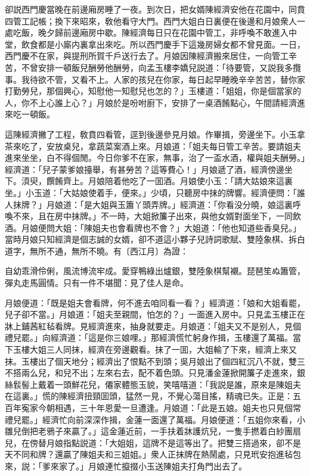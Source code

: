 卻説西門慶當晚在前邊廂房睡了一夜。到次日，把女婿陳經濟安他在花園中，同賁四管工記帳；換下來昭來，敎他看守大門。西門大姐白日裏便在後邊和月娘衆人一處吃飯，晚夕歸前邊廂房中歇。陳經濟每日只在花園中管工，非呼喚不敢進入中堂，飲食都是小廝内裏拿出來吃。所以西門慶手下這幾房婦女都不曾見面。一日，西門慶不在家，與提刑所賀千戶送行去了。月娘因陳經濟搬來居住，一向管工辛苦，不曾安排一頓飯兒酬勞他酬勞，向孟玉樓李嬌兒説道：「待要管，又説我多攬事。我待欲不管，又看不上。人家的孩兒在你家，每日起早睡晚辛辛苦苦，替你家打勤勞兒，那個興心，知慰他一知慰兒也怎的？」玉樓道：「姐姐，你是個當家的人，你不上心誰上心？」月娘於是吩咐廚下，安排了一桌酒餚點心，午間請經濟進來吃一頓飯。

這陳經濟撇了工程，敎賁四看管，逕到後邊參見月娘。作畢揖，旁邊坐下。小玉拿茶來吃了，安放桌兒，拿蔬菜案酒上來。月娘道：「姐夫每日管工辛苦。要請姐夫進來坐坐，白不得個閒。今日你爹不在家，無事，治了一盃水酒，權與姐夫酬勞。」經濟道：「兒子蒙爹娘擡舉，有甚勞苦？這等費心！」月娘遞了酒，經濟傍邊坐下。湏臾，饌餚齊上。月娘陪着他吃了一囬酒。月娘使小玉：「請大姑娘來這裏坐。」小玉道：「大姑娘使着手，便來。」少頃，只聽房中抹的牌響。經濟便問：「誰人抹牌？」月娘道：「是大姐與玉簫丫頭弄牌。」經濟道：「你看没分曉，娘這裏呼喚不來，且在房中抹牌。」不一時，大姐掀簾子出來，與他女婿對面坐下，一同飲酒。月娘便問大姐：「陳姐夫也會看牌也不會？」大姐道：「他也知道些香臭兒。」當時月娘只知經濟是個志誠的女婿，卻不道這小夥子兒詩詞歌賦、雙陸象棋、拆白道字，無所不通，無所不曉。有〔西江月〕為證：

\begin{myquote}
自幼乖滑伶俐，風流博流牢成。愛穿鴨綠出爐銀，雙陸象棋幫襯。琵琶笙ぬ簫管，彈丸走馬圓情。只有一件不堪聞：見了佳人是命。
\end{myquote}

月娘便道：「既是姐夫會看牌，何不進去咱同看一看？」經濟道：「娘和大姐看罷，兒子卻不當。」月娘道：「姐夫至親間，怕怎的？」一面進入房中。只見孟玉樓正在牀上鋪茜紅毡看牌。見經濟進來，抽身就要走。月娘道：「姐夫又不是别人，見個禮兒罷。」向經濟道：「這是你三娘哩。」那經濟慌忙躬身作揖，玉樓還了萬福。當下玉樓大姐三人同抹，經濟在旁邊觀看。抹了一囬，大姐輸了下來，經濟上來又抹。玉樓出了個天地分；經濟出了恨點不到頭；吳月娘出了個四紅沉八不就，雙三不搭兩么兒，和兒不出；左來右去，配不着色頭。只見潘金蓮掀開簾子走進來，銀絲䯼髻上戴着一頭鮮花兒，僊家體態玉貌，笑嘻嘻道：「我説是誰，原來是陳姐夫在這裏。」慌的陳經濟扭頸囬頭，猛然一見，不覺心蕩目搖，精魂已失。正是：五百年寃家今朝相遇，三十年恩愛一旦遭逢。月娘道：「此是五娘。姐夫也只見個常禮兒罷。」經濟忙向前深深作揖，金蓮一面還了萬福。月娘便道：「五姐你來看，小雛兒倒把老鴉子來贏了。」這金蓮近前，一手扶着牀護炕兒，一隻手撚着白紗團扇兒，在傍替月娘指點説道：「大姐姐，這牌不是這等出了。把雙三搭過來，卻不是天不同和牌？還贏了陳姐夫和三姐姐。」衆人正抹牌在熱鬧處，只見玳安抱進毡包來，説：「爹來家了。」月娘連忙攛掇小玉送陳姐夫打角門出去了。


